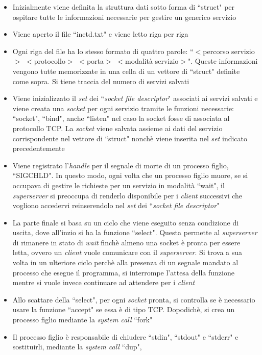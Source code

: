 \documentclass[a4paper, 12pt]{report}
\begin{document}
\begin{itemize}
    \item Inizialmente viene definita la struttura dati sotto forma di ``struct" per ospitare tutte le informazioni necessarie per gestire un generico servizio
    \item Viene aperto il file ``inetd.txt" e viene letto riga per riga
    \item Ogni riga del file ha lo stesso formato di quattro parole: ``$<$percorso servizio$>$ $<$protocollo$>$ $<$porta$>$ $<$modalità servizio$>$". Queste informazioni vengono tutte
    memorizzate in una cella di un vettore di ``struct" definite come sopra. Si tiene traccia del numero di servizi salvati
    \item Viene inizializzato il \textit{set} dei ``\textit{socket file descriptor}" associati ai servizi salvati e viene creata una \textit{socket} per ogni servizio tramite le
    funzioni necessarie: ``socket", ``bind", anche ``listen" nel caso la socket fosse di associata al protocollo TCP. La \textit{socket}
    viene salvata assieme ai dati del servizio corrispondente nel vettore di ``struct" nonchè viene inserita nel \textit{set} indicato precedentemente
    \item Viene registrato l'\textit{handle} per il segnale di morte di un processo figlio, ``SIGCHLD". In questo modo, ogni volta che un processo figlio muore,
    se si occupava di gestire le richieste per un servizio in modalità ``wait", il \textit{superserver} si preoccupa di renderlo disponibile per i \textit{client} successivi che vogliono
    accedervi reinserendolo nel \textit{set} dei ``\textit{socket file descriptor}"
    \item La parte finale si basa su un ciclo che viene eseguito senza condizione di uscita, dove all'inzio si ha la funzione ``select". Questa permette al
    \textit{superserver} di rimanere in stato di \textit{wait} finchè almeno una socket è pronta per essere letta, ovvero un \textit{client} vuole comunicare con il
    \textit{superserver}. Si trova a sua volta in un ulteriore ciclo perchè alla presenza di un segnale mandato al processo che esegue il programma, si interrompe l'attesa della funzione mentre
    si vuole invece continuare ad attendere per i \textit{client}
    \item Allo scattare della ``select", per ogni \textit{socket} pronta, si controlla se è necessario usare la funzione ``accept" se essa è di tipo
    TCP. Dopodichè, si crea un processo figlio mediante la \textit{system call} ``fork"
    \item Il processo figlio è responsabile di chiudere ``stdin", ``stdout" e ``stderr" e sostituirli, mediante la \textit{system call} ``dup",

\end{itemize}
\end{document}
